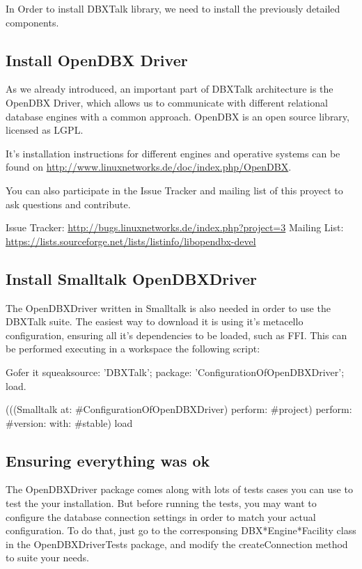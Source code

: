 \documentclass[a4paper,10pt,twoside]{book}
\begin{document}
In Order to install DBXTalk library, we need to install the previously detailed components.

\subsection*{Install OpenDBX Driver}

As we already introduced, an important part of DBXTalk architecture is the OpenDBX Driver, which allows us
to communicate with different relational database engines with a common approach.  OpenDBX is an open source library,
licensed as LGPL.

It's installation instructions for different engines and operative systems can be found on \url{http://www.linuxnetworks.de/doc/index.php/OpenDBX}.

You can also participate in the Issue Tracker and mailing list of this proyect to ask questions and contribute.

Issue Tracker: \url{http://bugs.linuxnetworks.de/index.php?project=3}
Mailing List: \url{https://lists.sourceforge.net/lists/listinfo/libopendbx-devel}

\subsection*{Install Smalltalk OpenDBXDriver}

The OpenDBXDriver written in Smalltalk is also needed in order to use the DBXTalk suite.  The easiest way to download it
is using it's metacello configuration, ensuring all it's dependencies to be loaded, such as FFI.  This can be performed executing
in a workspace the following script:

\begin{code}{}
Gofer it
	squeaksource: 'DBXTalk';
	package: 'ConfigurationOfOpenDBXDriver';
	load.
	
(((Smalltalk at: #ConfigurationOfOpenDBXDriver) perform: #project) perform: #version: with: #stable) load
\end{code}

\subsection*{Ensuring everything was ok}

The OpenDBXDriver package comes along with lots of tests cases you can use to test the your installation.  But before running
 the tests, you may want to configure the database connection settings in order to match your actual configuration.
To do that, just go to the corresponsing DBX*Engine*Facility class in the OpenDBXDriverTests package, and modify the
createConnection method to suite your needs.
\end{document}
